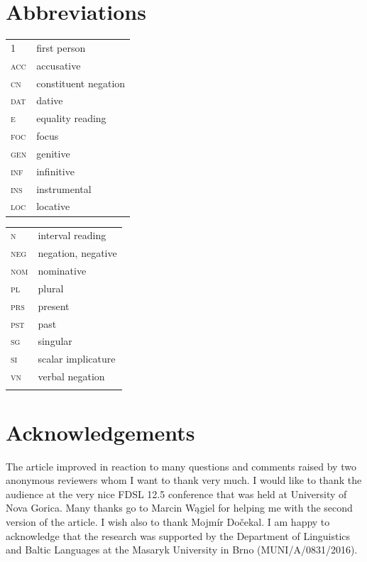 \documentclass[output=paper,
]{langscibook}
\begin{document}
\section*{Abbreviations}

\begin{tabularx}{.48\textwidth}{lX}
\textsc{1}&first person\\
\textsc{acc}&accusative\\
\textsc{cn}&constituent negation\\
\textsc{dat}&dative\\
\textsc{e}&equality reading\\
\textsc{foc}&focus\\
\textsc{gen}&genitive\\
\textsc{inf}&infinitive\\
\textsc{ins}&instrumental\\
\textsc{loc}&locative\\
\end{tabularx}
\begin{tabularx}{.48\textwidth}{lX}
\textsc{n}&interval reading\\
\textsc{neg}&negation, negative\\
\textsc{nom}&nominative\\
\textsc{pl}&plural\\
\textsc{prs}&present\\
\textsc{pst}&past\\
\textsc{sg}&singular\\
\textsc{si}&scalar implicature\\
\textsc{vn}&verbal negation\\
&\\
\end{tabularx}

\section*{Acknowledgements}
The article improved in reaction to many questions and comments raised by two anonymous reviewers whom I want to thank very much. I would like to thank the audience at the very nice FDSL 12.5 conference that was held at University of Nova Gorica. Many thanks go to Marcin Wągiel for helping me with the second version of the article. I wish also to thank Mojmír Dočekal. I am happy to acknowledge that the research was supported by the Department of Linguistics and Baltic Languages at the Masaryk University in Brno (MUNI/A/0831/2016).
 


\sloppy
\printbibliography[heading=subbibliography,notkeyword=this]
\end{document}
